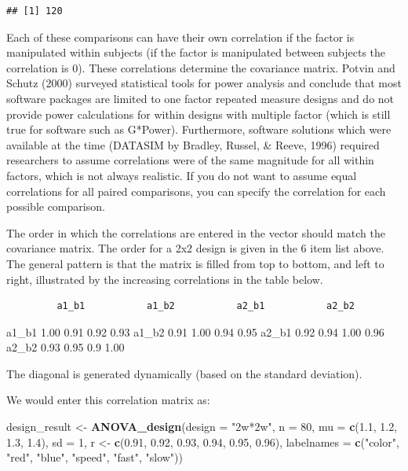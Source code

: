 \documentclass[]{book}
\newenvironment{Shaded}{\begin{snugshade}}{\end{snugshade}}
\newcommand{\DataTypeTok}[1]{\textcolor[rgb]{0.13,0.29,0.53}{#1}}
\newcommand{\DecValTok}[1]{\textcolor[rgb]{0.00,0.00,0.81}{#1}}
\newcommand{\FloatTok}[1]{\textcolor[rgb]{0.00,0.00,0.81}{#1}}
\newcommand{\KeywordTok}[1]{\textcolor[rgb]{0.13,0.29,0.53}{\textbf{#1}}}
\newcommand{\NormalTok}[1]{#1}
\newcommand{\StringTok}[1]{\textcolor[rgb]{0.31,0.60,0.02}{#1}}
\begin{document}
\begin{verbatim}
## [1] 120
\end{verbatim}

Each of these comparisons can have their own correlation if the factor is manipulated within subjects (if the factor is manipulated between subjects the correlation is 0). These correlations determine the covariance matrix. Potvin and Schutz (2000) surveyed statistical tools for power analysis and conclude that most software packages are limited to one factor repeated measure designs and do not provide power calculations for within designs with multiple factor (which is still true for software such as G*Power). Furthermore, software solutions which were available at the time (DATASIM by Bradley, Russel, \& Reeve, 1996) required researchers to assume correlations were of the same magnitude for all within factors, which is not always realistic. If you do not want to assume equal correlations for all paired comparisons, you can specify the correlation for each possible comparison.

The order in which the correlations are entered in the vector should match the covariance matrix.
The order for a 2x2 design is given in the 6 item list above. The general pattern is that the matrix is filled from top to bottom, and left to right, illustrated by the increasing correlations in the table below.

\begin{verbatim}
         a1_b1           a1_b2           a2_b1           a2_b2
\end{verbatim}

a1\_b1 1.00 0.91 0.92 0.93
a1\_b2 0.91 1.00 0.94 0.95
a2\_b1 0.92 0.94 1.00 0.96
a2\_b2 0.93 0.95 0.9 1.00

The diagonal is generated dynamically (based on the standard deviation).

We would enter this correlation matrix as:

\begin{Shaded}
\begin{Highlighting}[]
\NormalTok{design_result <-}\StringTok{ }\KeywordTok{ANOVA_design}\NormalTok{(}\DataTypeTok{design =} \StringTok{"2w*2w"}\NormalTok{,}
                              \DataTypeTok{n =} \DecValTok{80}\NormalTok{,}
                              \DataTypeTok{mu =} \KeywordTok{c}\NormalTok{(}\FloatTok{1.1}\NormalTok{, }\FloatTok{1.2}\NormalTok{, }\FloatTok{1.3}\NormalTok{, }\FloatTok{1.4}\NormalTok{),}
                              \DataTypeTok{sd =} \DecValTok{1}\NormalTok{,}
\NormalTok{                              r <-}\StringTok{ }\KeywordTok{c}\NormalTok{(}\FloatTok{0.91}\NormalTok{, }\FloatTok{0.92}\NormalTok{, }\FloatTok{0.93}\NormalTok{, }\FloatTok{0.94}\NormalTok{, }\FloatTok{0.95}\NormalTok{, }\FloatTok{0.96}\NormalTok{),}
                              \DataTypeTok{labelnames =} \KeywordTok{c}\NormalTok{(}\StringTok{"color"}\NormalTok{, }\StringTok{"red"}\NormalTok{, }\StringTok{"blue"}\NormalTok{, }\StringTok{"speed"}\NormalTok{, }\StringTok{"fast"}\NormalTok{, }\StringTok{"slow"}\NormalTok{))}
\end{Highlighting}
\end{Shaded}
\end{document}
